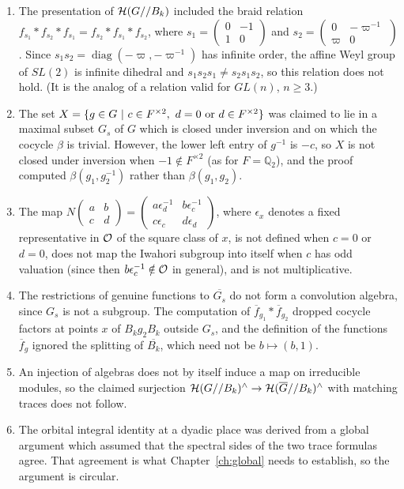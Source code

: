 \documentclass[12pt,letterpaper]{book}
\theoremstyle{plain}
\theoremstyle{definition}
\theoremstyle{remark}
\theoremstyle{remark}
\begin{document}
\begin{enumerate}
\item The presentation of ${\cal H}(G//B_k)$ included the braid relation
$f_{s_1}*f_{s_2}*f_{s_1}=f_{s_2}*f_{s_1}*f_{s_2}$, where
$s_1=\left(\begin{smallmatrix}0&-1\\1&0\end{smallmatrix}\right)$ and
$s_2=\left(\begin{smallmatrix}0&-\varpi^{-1}\\\varpi&0\end{smallmatrix}\right)$.
Since $s_1s_2=\operatorname{diag}(-\varpi,-\varpi^{-1})$ has infinite order, the affine
Weyl group of $SL(2)$ is infinite dihedral and
$s_1s_2s_1\neq s_2s_1s_2$, so this relation does not hold. (It is the
analog of a relation valid for $GL(n)$, $n\geq 3$.)

\item The set
$X=\{g\in G\ |\ c\in F^{\times 2},\ d=0\ {\rm or}\ d\in F^{\times 2}\}$
was claimed to lie in a maximal subset $G_s$ of $G$ which is closed under
inversion and on which the cocycle $\beta$ is trivial. However, the
lower left entry of $g^{-1}$ is $-c$, so $X$ is not closed under inversion
when $-1\notin F^{\times 2}$ (as for $F={\mathbb Q}_2$), and the proof
computed $\beta(g_1,g_2^{-1})$ rather than $\beta(g_1,g_2)$.

\item The map
$N\left(\begin{smallmatrix}a&b\\c&d\end{smallmatrix}\right)=
\left(\begin{smallmatrix}a\epsilon_d^{-1}&b\epsilon_c^{-1}\\
c\epsilon_c&d\epsilon_d\end{smallmatrix}\right)$,
where $\epsilon_x$ denotes a fixed representative in ${\cal O}$ of the
square class of $x$, is not defined when $c=0$ or $d=0$, does not
map the Iwahori subgroup into itself when $c$ has odd valuation (since
then $b\epsilon_c^{-1}\notin{\cal O}$ in general), and is not
multiplicative.

\item The restrictions of genuine functions to $\overline{G_s}$ do not
form a convolution algebra, since $G_s$ is not a subgroup. The
computation of $\overline{f}_{g_1}*\overline{f}_{g_2}$ dropped cocycle
factors at points $x$ of $B_kg_2B_k$ outside $G_s$, and the
definition of the functions $\overline{f}_g$ ignored the splitting of
$\overline{B_k}$, which need not be $b\mapsto (b,1)$.

\item An injection of algebras does not by itself induce a map on
irreducible modules, so the claimed surjection
${\cal H}(G//B_k)^\wedge\rightarrow{\cal H}(\overline{G}//B_k)^\wedge$
with matching traces does not follow.

\item The orbital integral identity at a dyadic place was derived from
a global argument which assumed that the spectral sides of the two trace
formulas agree. That agreement is what Chapter~\ref{ch:global} needs to
establish, so the argument is circular.
\end{enumerate}
\end{document}
